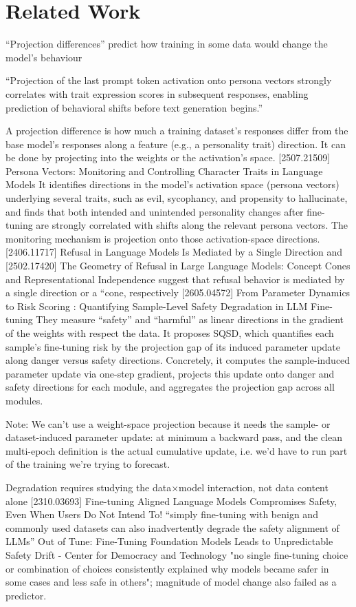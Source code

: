 \chapter{Related Work}
\label{ch:related_work}

“Projection differences” predict how training in some data would change the model’s behaviour

“Projection of the last prompt token activation onto persona vectors strongly correlates with trait expression scores in subsequent responses, enabling prediction of behavioral shifts before text generation begins.”

A projection difference is how much a training dataset's responses differ from the base model's responses along a feature (e.g., a personality trait) direction. It can be done by projecting into the weights or the activation’s space. 
[2507.21509] Persona Vectors: Monitoring and Controlling Character Traits in Language Models It identifies directions in the model's activation space (persona vectors) underlying several traits, such as evil, sycophancy, and propensity to hallucinate, and finds that both intended and unintended personality changes after fine-tuning are strongly correlated with shifts along the relevant persona vectors. The monitoring mechanism is projection onto those activation-space directions.
 [2406.11717] Refusal in Language Models Is Mediated by a Single Direction and [2502.17420] The Geometry of Refusal in Large Language Models: Concept Cones and Representational Independence suggest that refusal behavior is mediated by a single direction or a “cone, respectively
[2605.04572] From Parameter Dynamics to Risk Scoring : Quantifying Sample-Level Safety Degradation in LLM Fine-tuning They measure “safety” and “harmful” as linear directions in the gradient of the weights with respect the data. It proposes SQSD, which quantifies each sample's fine-tuning risk by the projection gap of its induced parameter update along danger versus safety directions. Concretely, it computes the sample-induced parameter update via one-step gradient, projects this update onto danger and safety directions for each module, and aggregates the projection gap across all modules.

Note: We can’t use a weight-space projection because it needs the sample- or dataset-induced parameter update: at minimum a backward pass, and the clean multi-epoch definition is the actual cumulative update, i.e. we’d have to run part of the training we're trying to forecast. 


Degradation requires studying the data×model interaction, not data content alone
[2310.03693] Fine-tuning Aligned Language Models Compromises Safety, Even When Users Do Not Intend To! “simply fine-tuning with benign and commonly used datasets can also inadvertently degrade the safety alignment of LLMs”
Out of Tune: Fine-Tuning Foundation Models Leads to Unpredictable Safety Drift - Center for Democracy and Technology "no single fine-tuning choice or combination of choices consistently explained why models became safer in some cases and less safe in others"; magnitude of model change also failed as a predictor. 


